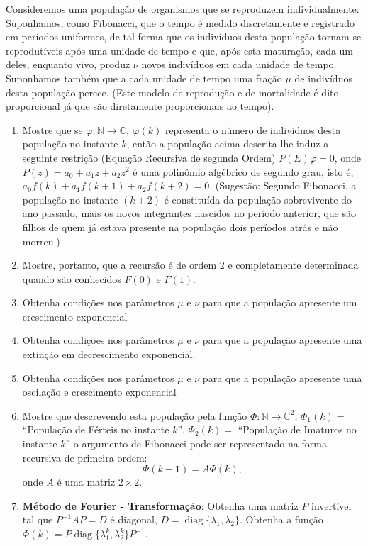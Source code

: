 \begin{exercise}
Consideremos uma população de organismos que se reproduzem individualmente. Suponhamos, como Fibonacci, que o tempo é medido discretamente e registrado em períodos uniformes, de tal forma que os indivíduos desta população tornam-se reprodutíveis após uma unidade de tempo e que, após esta maturação, cada um deles, enquanto vivo, produz \(\nu\) novos indivíduos em cada unidade de tempo. Suponhamos também que a cada unidade de tempo uma fração \(\mu\) de indivíduos desta população perece. (Este modelo de reprodução e de mortalidade é dito proporcional já que são diretamente proporcionais ao tempo).

\begin{enumerate}
\item Mostre que se \(\varphi: \mathbb{N} \to \mathbb{C},\ \varphi(k)\) representa o número de indivíduos desta população no instante \(k\), então a população acima descrita lhe induz a seguinte restrição (Equação Recursiva de segunda Ordem) \(P(E) \varphi = 0\), onde \(P(z) = a_0 + a_1 z + a_2 z^2\) é uma polinômio algébrico de segundo grau, isto é, \(a_0f(k) + a_1f(k+1) + a_2 f(k+2) = 0\). (Sugestão: Segundo Fibonacci, a população no instante \((k+2)\) é constituída da população sobrevivente do ano passado, mais os novos integrantes nascidos no período anterior, que são filhos de quem já estava presente na população dois períodos atrás e não morreu.)
\item Mostre, portanto, que a recursão é de ordem \(2\) e completamente determinada quando são conhecidos \(F(0)\) e \(F(1)\).
\item Obtenha condições nos parâmetros \(\mu\) e \(\nu\) para que a população apresente um crescimento exponencial
\item Obtenha condições nos parâmetros \(\mu\) e \(\nu\) para que a população apresente uma extinção em decrescimento exponencial.
\item Obtenha condições nos parâmetros \(\mu\) e \(\nu\) para que a população apresente uma oscilação e crescimento exponencial
\item Mostre que descrevendo esta população pela função \(\Phi: \mathbb{N} \to \mathbb{C}^2\), \(\Phi_1(k) =\) ``População de Férteis no instante \(k\)'', \(\Phi_2(k) =\) ``População de Imaturos no instante \(k\)'' o argumento de Fibonacci pode ser representado na forma recursiva de primeira ordem:
\[\Phi(k+1) = A \Phi(k),\] onde \(A\) é uma matriz \(2 \times 2\).
\item \textbf{Método de Fourier - Transformação}: Obtenha uma matriz \(P\) invertível tal que \(P^{-1}A P = D\) é diagonal, \(D = \operatorname{diag}\{\lambda_1, \lambda_2\}\). Obtenha a função \(\Phi(k) = P \operatorname{diag}\{\lambda_1^k, \lambda_2^k\} P^{-1}\).

\end{enumerate}
\end{exercise}
